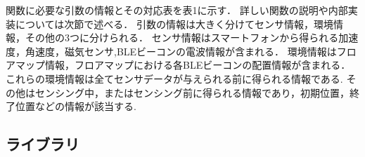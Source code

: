 \documentclass[Japanese]{dicomopapers}
\begin{document}
関数に必要な引数の情報とその対応表を表1に示す．
詳しい関数の説明や内部実装については次節で述べる．
引数の情報は大きく分けてセンサ情報，環境情報，その他の3つに分けられる．
センサ情報はスマートフォンから得られる加速度，角速度，磁気センサ,BLEビーコンの電波情報が含まれる．
環境情報はフロアマップ情報，フロアマップにおける各BLEビーコンの配置情報が含まれる．
これらの環境情報は全てセンサデータが与えられる前に得られる情報である.
その他はセンシング中，またはセンシング前に得られる情報であり，初期位置，終了位置などの情報が該当する.

\subsection{ライブラリ}
\begin{table}[ht]
	\centering
\end{table}
\end{document}

